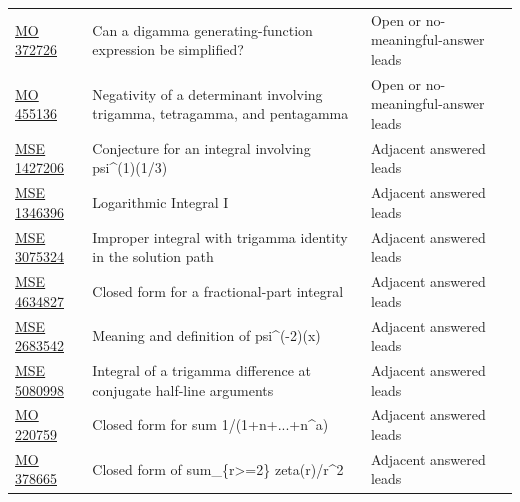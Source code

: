\begin{longtable}{@{}p{}p{}p{}@{}}
\href{https://mathoverflow.net/questions/372726/can-x-sum-k-1-infty-frac1k-big-gamma-psi-big1-fracx}{MO 372726} & Can a digamma generating-function expression be simplified? & Open or no-meaningful-answer leads\\
\href{https://mathoverflow.net/questions/455136/how-to-prove-negativity-of-a-3-times3-determinant-whose-elements-involve-triga}{MO 455136} & Negativity of a determinant involving trigamma, tetragamma, and pentagamma & Open or no-meaningful-answer leads\\
\href{https://math.stackexchange.com/questions/1427206/conjecture-int-01-frac-ln2-left1xx2-rightx-dx-stackrel-frac2-pi9}{MSE 1427206} & Conjecture for an integral involving psi\textasciicircum{}(1)(1/3) & Adjacent answered leads\\
\href{https://math.stackexchange.com/questions/1346396/logarithmic-integral-i}{MSE 1346396} & Logarithmic Integral I & Adjacent answered leads\\
\href{https://math.stackexchange.com/questions/3075324/improper-integral-int-limits-0-infty-frac-x2-arctan-x-x4-x2-1}{MSE 3075324} & Improper integral with trigamma identity in the solution path & Adjacent answered leads\\
\href{https://math.stackexchange.com/questions/4634827/closed-form-for-int-01-left-fracmx-right-n-dx}{MSE 4634827} & Closed form for a fractional-part integral & Adjacent answered leads\\
\href{https://math.stackexchange.com/questions/2683542/the-meaning-and-definition-of-psi-2x-and-the-convergence-of-some-rela}{MSE 2683542} & Meaning and definition of psi\textasciicircum{}(-2)(x) & Adjacent answered leads\\
\href{https://math.stackexchange.com/questions/5080998/int-0-infty-frac-psi1-left-tfrac1-i-u2-right-psi1-left}{MSE 5080998} & Integral of a trigamma difference at conjugate half-line arguments & Adjacent answered leads\\
\href{https://mathoverflow.net/questions/220759/closed-form-for-sum-n-1-infty-frac11nn2-cdotsna}{MO 220759} & Closed form for sum 1/(1+n+...+n\textasciicircum{}a) & Adjacent answered leads\\
\href{https://mathoverflow.net/questions/378665/closed-form-of-the-sum-sum-r-ge2-frac-zetarr2}{MO 378665} & Closed form of sum\_\{r>=2\} zeta(r)/r\textasciicircum{}2 & Adjacent answered leads\\
\bottomrule
\end{longtable}
\normalsize

